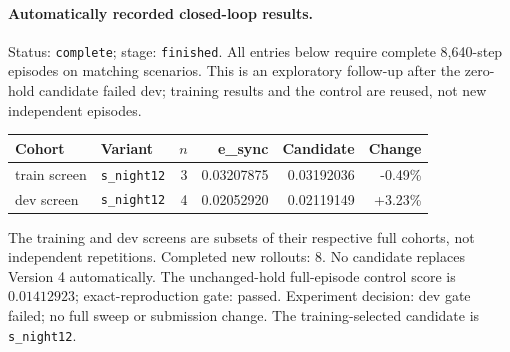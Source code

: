 \paragraph{Automatically recorded closed-loop results.}
Status: \texttt{complete}; stage: \texttt{finished}.
All entries below require complete 8,640-step episodes on matching scenarios.
This is an exploratory follow-up after the zero-hold candidate failed dev; training results and the control are reused, not new independent episodes.
\begin{center}\small
\begin{tabular}{llrrrr}\toprule
Cohort & Variant & $n$ & e\_sync & Candidate & Change \\\midrule
train screen & \texttt{s\_night12} & 3 & 0.03207875 & 0.03192036 & -0.49\% \\
dev screen & \texttt{s\_night12} & 4 & 0.02052920 & 0.02119149 & +3.23\% \\
\bottomrule\end{tabular}\end{center}
The training and dev screens are subsets of their respective full cohorts, not independent repetitions.
Completed new rollouts: 8. No candidate replaces Version 4 automatically.
The unchanged-hold full-episode control score is $0.01412923$; exact-reproduction gate: passed.
Experiment decision: dev gate failed; no full sweep or submission change.
The training-selected candidate is \texttt{s\_night12}.

